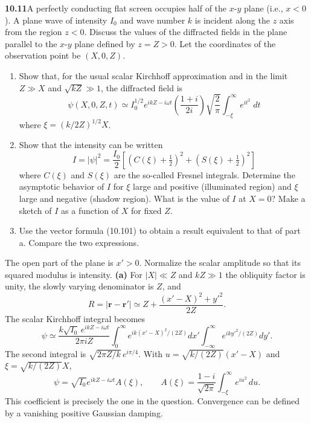 \par\bigskip
\noindent\textbf{10.11}\quad A perfectly conducting flat screen occupies half of the $x$-$y$ plane (i.e., $x<0$). A plane wave of intensity $I_{0}$ and wave number $k$ is incident along the $z$ axis from the region $z<0$. Discuss the values of the diffracted fields in the plane parallel to the $x$-$y$ plane defined by $z=Z>0$. Let the coordinates of the observation point be $(X,0,Z)$.
\begin{enumerate}
\item[(a)] Show that, for the usual scalar Kirchhoff approximation and in the limit $Z\gg X$ and $\sqrt{kZ}\gg1$, the diffracted field is
\[
\psi(X,0,Z,t)\simeq I_{0}^{1/2}e^{ikZ-i\omega t}\!\left(\frac{1+i}{2i}\right)\sqrt{\frac{2}{\pi}}\int_{-\xi}^{\infty}e^{it^{2}}\;dt
\]
where $\xi=(k/2Z)^{1/2}X$.
\item[(b)] Show that the intensity can be written
\[
I=|\psi|^{2}=\frac{I_{0}}{2}\left[(C(\xi)+\tfrac{1}{2})^{2}+(S(\xi)+\tfrac{1}{2})^{2}\right]
\]
where $C(\xi)$ and $S(\xi)$ are the so-called Fresnel integrals. Determine the asymptotic behavior of $I$ for $\xi$ large and positive (illuminated region) and $\xi$ large and negative (shadow region). What is the value of $I$ at $X=0$? Make a sketch of $I$ as a function of $X$ for fixed $Z$.
\item[(c)] Use the vector formula (10.101) to obtain a result equivalent to that of part a. Compare the two expressions.
\end{enumerate}
\solution
The open part of the plane is $x'>0$. Normalize the scalar amplitude so
that its squared modulus is intensity.
\textbf{(a)} For $|X|\ll Z$ and $kZ\gg1$ the obliquity factor is unity,
the slowly varying denominator is $Z$, and
\[
R=|\mathbf r-\mathbf r'|
\simeq Z+\frac{(x'-X)^2+y'^2}{2Z}.
\]
The scalar Kirchhoff integral becomes
\[
\psi\simeq\frac{k\sqrt{I_0}\,e^{ikZ-i\omega t}}{2\pi iZ}
\int_0^\infty e^{ik(x'-X)^2/(2Z)}dx'
\int_{-\infty}^\infty e^{iky'^2/(2Z)}dy'.
\]
The second integral is $\sqrt{2\pi Z/k}\,e^{i\pi/4}$.
With $u=\sqrt{k/(2Z)}(x'-X)$ and $\xi=\sqrt{k/(2Z)}X$,
\[
\boxed{\psi=\sqrt{I_0}e^{ikZ-i\omega t}A(\xi),\qquad
A(\xi)=\frac{1-i}{\sqrt{2\pi}}\int_{-\xi}^{\infty}e^{iu^2}\,du.}
\]
This coefficient is precisely the one in the question. Convergence can
be defined by a vanishing positive Gaussian damping.

